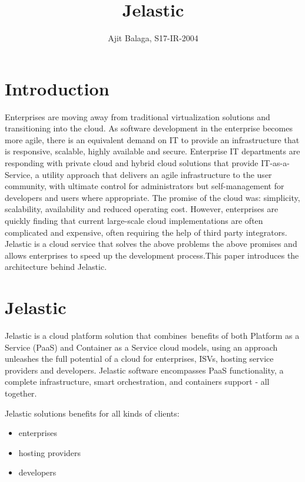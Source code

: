 \documentclass[9pt,twocolumn,twoside]{styles/osajnl}
\title{Jelastic}
\author[1]{Ajit Balaga, S17-IR-2004}
\affil[1]{School of Informatics and Computing, Bloomington, IN 47408, U.S.A.}
\affil[*]{Corresponding authors: abalaga@iu.edu, ajit.balaga@gmail.com}
\begin{document}
\maketitle

\section{Introduction}
Enterprises are moving away from traditional virtualization solutions and 
transitioning into the cloud. As software development in the enterprise becomes 
more agile, there is an equivalent demand on IT to provide an infrastructure 
that is responsive, scalable, highly available and secure. Enterprise IT 
departments are responding with private cloud and hybrid cloud solutions that 
provide IT-as-a-Service, a utility approach that delivers an agile 
infrastructure to the user community, with ultimate control for administrators 
but self-management for developers and users where appropriate. The promise of 
the cloud was: simplicity, scalability, availability and reduced operating cost. 
However, enterprises are quickly finding that current large-scale cloud 
implementations are often complicated and expensive, often requiring the help of 
third party integrators. Jelastic is a cloud service that solves the above 
problems the above promises and allows enterprises to speed up the development 
process.This paper introduces the architecture behind Jelastic.\cite{www-jelastic6}

\section{Jelastic}
Jelastic is a cloud platform solution that combines benefits of both Platform as
a Service (PaaS) and Container as a Service cloud models, using an approach
unleashes the full potential of a cloud for enterprises, ISVs, hosting service
providers and developers. Jelastic software encompasses PaaS functionality, a
complete infrastructure, smart orchestration, and containers support - all
together.\cite{www-jelastic1}

Jelastic solutions benefits for all kinds of clients:
\begin{itemize}
\renewcommand{\labelitemi}{\scriptsize$\square$}
\item enterprises
\item hosting providers
\item developers
\end{itemize}\cite{www-jelastic1}
\end{document}
